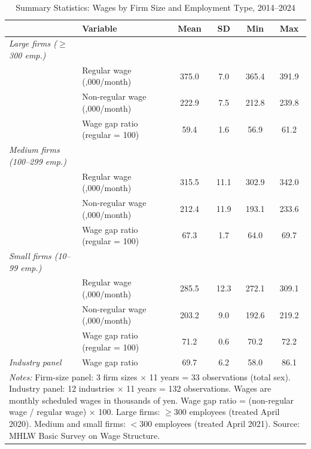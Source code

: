 \begin{table}[t]
\centering
\caption{Summary Statistics: Wages by Firm Size and Employment Type, 2014--2024}
\label{tab:summary}
\small
\begin{tabular}{llcccc}
\toprule
 & Variable & Mean & SD & Min & Max \\
\midrule
\textit{Large firms ($\geq$300 emp.)} & & & & & \\
 & Regular wage (\textyen 1,000/month) & 375.0 & 7.0 & 365.4 & 391.9 \\
 & Non-regular wage (\textyen 1,000/month) & 222.9 & 7.5 & 212.8 & 239.8 \\
 & Wage gap ratio (regular = 100) & 59.4 & 1.6 & 56.9 & 61.2 \\
\textit{Medium firms (100--299 emp.)} & & & & & \\
 & Regular wage (\textyen 1,000/month) & 315.5 & 11.1 & 302.9 & 342.0 \\
 & Non-regular wage (\textyen 1,000/month) & 212.4 & 11.9 & 193.1 & 233.6 \\
 & Wage gap ratio (regular = 100) & 67.3 & 1.7 & 64.0 & 69.7 \\
\textit{Small firms (10--99 emp.)} & & & & & \\
 & Regular wage (\textyen 1,000/month) & 285.5 & 12.3 & 272.1 & 309.1 \\
 & Non-regular wage (\textyen 1,000/month) & 203.2 & 9.0 & 192.6 & 219.2 \\
 & Wage gap ratio (regular = 100) & 71.2 & 0.6 & 70.2 & 72.2 \\
\midrule
\textit{Industry panel} & Wage gap ratio & 69.7 & 6.2 & 58.0 & 86.1 \\
\bottomrule
\multicolumn{6}{p{0.95\textwidth}}{\footnotesize \textit{Notes:} Firm-size panel: 3 firm sizes $\times$ 11 years = 33 observations (total sex). Industry panel: 12 industries $\times$ 11 years = 132 observations. Wages are monthly scheduled wages in thousands of yen. Wage gap ratio = (non-regular wage / regular wage) $\times$ 100. Large firms: $\geq$300 employees (treated April 2020). Medium and small firms: $<$300 employees (treated April 2021). Source: MHLW Basic Survey on Wage Structure.} \\
\end{tabular}
\end{table}

